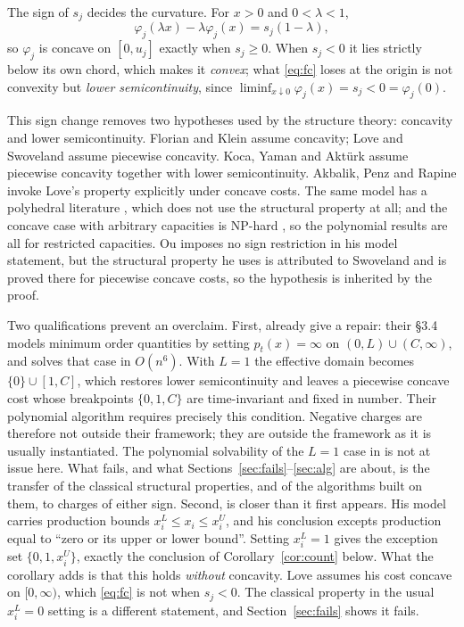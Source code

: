 \documentclass[3p,11pt]{elsarticle}
\theoremstyle{remark}
\theoremstyle{definition}
\begin{document}
The sign of $s_j$ decides the curvature. For $x>0$ and $0<\lambda<1$,
\begin{equation}\label{eq:chord}
\varphi_j(\lambda x)-\lambda\varphi_j(x)=s_j(1-\lambda),
\end{equation}
so $\varphi_j$ is concave on $[0,u_j]$ exactly when $s_j\ge0$. When $s_j<0$ it lies
strictly below its own chord, which makes it \emph{convex}; what \eqref{eq:fc} loses at
the origin is not convexity but \emph{lower semicontinuity}, since
$\liminf_{x\downarrow0}\varphi_j(x)=s_j<0=\varphi_j(0)$.

This sign change removes two hypotheses used by the structure theory: concavity and lower
semicontinuity. Florian and Klein \cite{fk71} assume concavity;
Love \cite{love73} and Swoveland \cite{swoveland75} assume piecewise concavity. Koca,
Yaman and Akt\"urk \cite{kya14} assume piecewise concavity together with lower
semicontinuity. Akbalik, Penz and Rapine \cite{apr15} invoke Love's property explicitly
under concave costs. The same model has a polyhedral literature \cite{ak05}, which does
not use the structural property at all; and the concave case with arbitrary capacities is
NP-hard \cite{flr80}, so the polynomial results are all for restricted capacities. Ou \cite{ou17} imposes no sign restriction in his model statement,
but the structural property he uses is attributed to Swoveland and is proved there for
piecewise concave costs, so the hypothesis is inherited by the proof.

Two qualifications prevent an overclaim. First, \cite{kya14} already give a repair:
their \S3.4 models minimum order quantities by setting $p_t(x)=\infty$ on
$(0,L)\cup(C,\infty)$, and solves that case in $O(n^6)$. With $L=1$ the effective domain
becomes $\{0\}\cup[1,C]$, which restores lower semicontinuity and leaves a piecewise
concave cost whose breakpoints $\{0,1,C\}$ are time-invariant and fixed in number. Their
polynomial algorithm requires precisely this condition. Negative charges are
therefore not outside their framework; they are outside the framework as it is usually
instantiated. The polynomial solvability of the $L=1$ case in \cite{kya14} is not at issue
here. What fails, and what Sections~\ref{sec:fails}--\ref{sec:alg} are about, is the
transfer of the classical structural properties, and of the algorithms built on them, to
charges of either sign.
Second, \cite{love73} is closer than it first appears. His model carries production bounds
$x^L_i\le x_i\le x^U_i$, and his conclusion excepts production equal to ``zero or its
upper or lower bound''. Setting $x^L_i=1$ gives the exception set $\{0,1,x^U_i\}$, exactly
the conclusion of Corollary~\ref{cor:count} below. What the corollary adds
is that this holds \emph{without} concavity. Love assumes his cost concave on
$[0,\infty)$, which \eqref{eq:fc} is not when $s_j<0$. The classical property in the usual
$x^L_i=0$ setting is a different statement, and Section~\ref{sec:fails} shows it fails.
\end{document}
